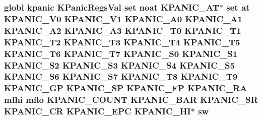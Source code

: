 \hypertarget{mips_2kpanica_8S_a471a6b72df82affa86c1f5c7377c5f72}{
\subsubsection[{sw}]{\setlength{\rightskip}{0pt plus 5cm}globl {\bf kpanic} {\bf K\-Panic\-Regs\-Val} set noat {\bf K\-P\-A\-N\-I\-C\-\_\-\-A\-T}$\ast$ set at {\bf K\-P\-A\-N\-I\-C\-\_\-\-V0} {\bf K\-P\-A\-N\-I\-C\-\_\-\-V1} {\bf K\-P\-A\-N\-I\-C\-\_\-\-A0} {\bf K\-P\-A\-N\-I\-C\-\_\-\-A1} {\bf K\-P\-A\-N\-I\-C\-\_\-\-A2} {\bf K\-P\-A\-N\-I\-C\-\_\-\-A3} {\bf K\-P\-A\-N\-I\-C\-\_\-\-T0} {\bf K\-P\-A\-N\-I\-C\-\_\-\-T1} {\bf K\-P\-A\-N\-I\-C\-\_\-\-T2} {\bf K\-P\-A\-N\-I\-C\-\_\-\-T3} {\bf K\-P\-A\-N\-I\-C\-\_\-\-T4} {\bf K\-P\-A\-N\-I\-C\-\_\-\-T5} {\bf K\-P\-A\-N\-I\-C\-\_\-\-T6} {\bf K\-P\-A\-N\-I\-C\-\_\-\-T7} {\bf K\-P\-A\-N\-I\-C\-\_\-\-S0} {\bf K\-P\-A\-N\-I\-C\-\_\-\-S1} {\bf K\-P\-A\-N\-I\-C\-\_\-\-S2} {\bf K\-P\-A\-N\-I\-C\-\_\-\-S3} {\bf K\-P\-A\-N\-I\-C\-\_\-\-S4} {\bf K\-P\-A\-N\-I\-C\-\_\-\-S5} {\bf K\-P\-A\-N\-I\-C\-\_\-\-S6} {\bf K\-P\-A\-N\-I\-C\-\_\-\-S7} {\bf K\-P\-A\-N\-I\-C\-\_\-\-T8} {\bf K\-P\-A\-N\-I\-C\-\_\-\-T9} {\bf K\-P\-A\-N\-I\-C\-\_\-\-G\-P} {\bf K\-P\-A\-N\-I\-C\-\_\-\-S\-P} {\bf K\-P\-A\-N\-I\-C\-\_\-\-F\-P} {\bf K\-P\-A\-N\-I\-C\-\_\-\-R\-A} mfhi mflo {\bf K\-P\-A\-N\-I\-C\-\_\-\-C\-O\-U\-N\-T} {\bf K\-P\-A\-N\-I\-C\-\_\-\-B\-A\-R} {\bf K\-P\-A\-N\-I\-C\-\_\-\-S\-R} {\bf K\-P\-A\-N\-I\-C\-\_\-\-C\-R} {\bf K\-P\-A\-N\-I\-C\-\_\-\-E\-P\-C} {\bf K\-P\-A\-N\-I\-C\-\_\-\-H\-I}$\ast$ sw}}\label{mips_2kpanica_8S_a471a6b72df82affa86c1f5c7377c5f72}
